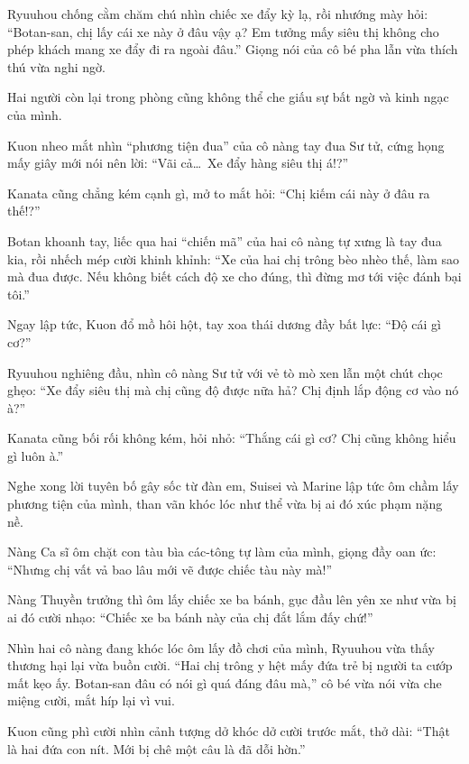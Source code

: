\documentclass[../main.tex]{subfiles}
\begin{document}

Ryuuhou chống cằm chăm chú nhìn chiếc xe đẩy kỳ lạ, rồi nhướng mày hỏi: ``Botan-san, chị lấy cái xe này ở đâu vậy ạ? Em tưởng mấy siêu thị không cho phép khách mang xe đẩy đi ra ngoài đâu.'' Giọng nói của cô bé pha lẫn vừa thích thú vừa nghi ngờ.

Hai người còn lại trong phòng cũng không thể che giấu sự bất ngờ và kinh ngạc của mình.

Kuon nheo mắt nhìn ``phương tiện đua'' của cô nàng tay đua Sư tử, cứng họng mấy giây mới nói nên lời: ``Vãi cả\dots\ Xe đẩy hàng siêu thị á!?''

Kanata cũng chẳng kém cạnh gì, mở to mắt hỏi: ``Chị kiếm cái này ở đâu ra thế!?''

Botan khoanh tay, liếc qua hai ``chiến mã'' của hai cô nàng tự xưng là tay đua kia, rồi nhếch mép cười khinh khỉnh: ``Xe của hai chị trông bèo nhèo thế, làm sao mà đua được. Nếu không biết cách độ xe cho đúng, thì đừng mơ tới việc đánh bại tôi.''

Ngay lập tức, Kuon đổ mồ hôi hột, tay xoa thái dương đầy bất lực: ``Độ cái gì cơ?''

Ryuuhou nghiêng đầu, nhìn cô nàng Sư tử với vẻ tò mò xen lẫn một chút chọc ghẹo: ``Xe đẩy siêu thị mà chị cũng độ được nữa hả? Chị định lắp động cơ vào nó à?''

Kanata cũng bối rối không kém, hỏi nhỏ: ``Thắng cái gì cơ? Chị cũng không hiểu gì luôn à.''

Nghe xong lời tuyên bố gây sốc từ đàn em, Suisei và Marine lập tức ôm chầm lấy phương tiện của mình, than vãn khóc lóc như thể vừa bị ai đó xúc phạm nặng nề.

Nàng Ca sĩ ôm chặt con tàu bìa các-tông tự làm của mình, giọng đầy oan ức: ``Nhưng chị vất vả bao lâu mới vẽ được chiếc tàu này mà!''

Nàng Thuyền trưởng thì ôm lấy chiếc xe ba bánh, gục đầu lên yên xe như vừa bị ai đó cười nhạo: ``Chiếc xe ba bánh này của chị đắt lắm đấy chứ!''


Nhìn hai cô nàng đang khóc lóc ôm lấy đồ chơi của mình, Ryuuhou vừa thấy thương hại lại vừa buồn cười. ``Hai chị trông y hệt mấy đứa trẻ bị người ta cướp mất kẹo ấy. Botan-san đâu có nói gì quá đáng đâu mà,'' cô bé vừa nói vừa che miệng cười, mắt híp lại vì vui.

Kuon cũng phì cười nhìn cảnh tượng dở khóc dở cười trước mắt, thở dài: ``Thật là hai đứa con nít. Mới bị chê một câu là đã dỗi hờn.''
\end{document}
